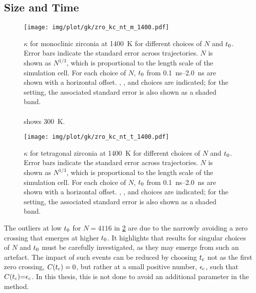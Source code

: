 \clearpage
\subsection{Size and Time}

\begin{figure*}
  \texttt{[image: img/plot/gk/zro\_kc\_nt\_m\_1400.pdf]}
  \caption{
  $\kappa$ for monoclinic zirconia at \qty{1400}{K} for different choices of $N$ and $t_0$.
  Error bars indicate the standard error across trajectories.
  $N$ is shown as $N^{1/3}$, which is proportional to the length scale of the simulation cell.
  For each choice of $N$, $t_0$ from \qtyrange{0.1}{2.0}{ns} are shown with a horizontal offset.
  , ,  and  choices are indicated; for the  setting, the associated standard error is also shown as a shaded band.
  \\\\
   shows \qty{300}{K}.
  }
  \label{fig:si-gkc_nt_m_1400}
\end{figure*}


\clearpage
\begin{figure*}
  \texttt{[image: img/plot/gk/zro\_kc\_nt\_t\_1400.pdf]}
  \caption{
  $\kappa$ for tetragonal zirconia at \qty{1400}{K} for different choices of $N$ and $t_0$.
  Error bars indicate the standard error across trajectories.
  $N$ is shown as $N^{1/3}$, which is proportional to the length scale of the simulation cell.
  For each choice of $N$, $t_0$ from \qtyrange{0.1}{2.0}{ns} are shown with a horizontal offset.
  , ,  and  choices are indicated; for the  setting, the associated standard error is also shown as a shaded band.
  }
  \label{fig:si-gkc_nt_t_1400}
\end{figure*}

\noindent
The outliers at low $t_0$ for $N{=}4116$ in \cref{fig:si-gkc_nt_t_1400} are due to the \hfacf narrowly avoiding a zero crossing that emerges at higher $t_0$.
It highlights that results for singular choices of $N$ and $t_0$ must be carefully investigated, as they may emerge from such an artefact.
The impact of such events can be reduced by choosing $t_{\text{c}}$ not as the first zero crossing, $C(t_{\text{c}}) = 0$, but rather at a small positive number, $\epsilon_{\text{c}}$, such that $C(t_{\text{c}}){=}\epsilon_{\text{c}}$. In this thesis, this is not done to avoid an additional parameter in the \gk method.

